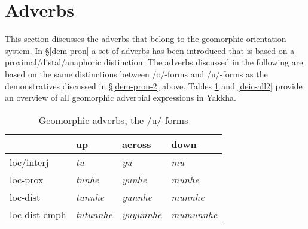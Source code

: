 \section{Adverbs}\label{geodeixis}

This section discusses the adverbs that belong to the geomorphic  orientation system. In §\ref{dem-pron} a set of adverbs has been introduced that is based on a proximal/distal/anaphoric distinction. The adverbs discussed in the following are based on the same distinctions between /o/-forms and /u/-forms as the demonstratives discussed in §\ref{dem-pron-2} above. 
Tables \ref{deic-all1} and \ref{deic-all2}  provide an overview of all geomorphic adverbial expressions in Yakkha. 
	 	  
 \begin{table}[htp]
\begin{centering}
\begin{tabular}{llll}
\toprule
									&{\sc up}		&{\sc across}&{\sc down}\\
\midrule
			{\sc loc/interj}	&\emph{tu}&\emph{yu}&\emph{mu}\\
			{\sc loc-prox}&\emph{tunhe}&\emph{yunhe}&\emph{munhe}\\
			{\sc loc-dist}&\emph{tunnhe}&\emph{yunnhe}&\emph{munnhe}\\
			{\sc loc-dist-emph}&\emph{tutunnhe}&\emph{yuyunnhe}&\emph{mumunnhe}\\
\bottomrule
\end{tabular} 
\caption{Geomorphic adverbs, the /u/-forms}\label{deic-all1}
\end{centering}
\end{table}

